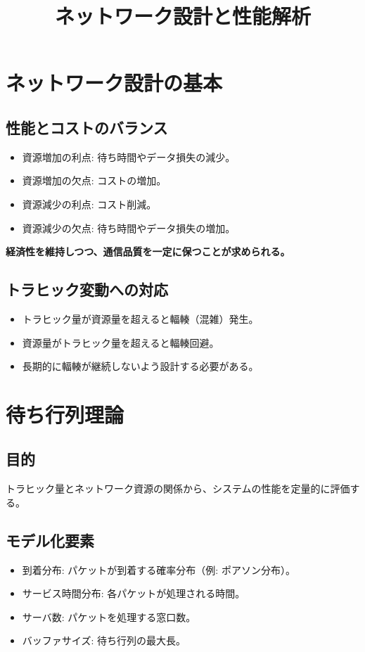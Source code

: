 \documentclass[a4paper,12pt]{ltjsarticle}
\title{ネットワーク設計と性能解析}
\author{}
\date{}
\begin{document}
\maketitle

\section{ネットワーク設計の基本}

\subsection*{性能とコストのバランス}
\begin{itemize}
    \item 資源増加の利点: 待ち時間やデータ損失の減少。
    \item 資源増加の欠点: コストの増加。
    \item 資源減少の利点: コスト削減。
    \item 資源減少の欠点: 待ち時間やデータ損失の増加。
\end{itemize}
\textbf{経済性を維持しつつ、通信品質を一定に保つことが求められる。}

\subsection*{トラヒック変動への対応}
\begin{itemize}
    \item トラヒック量が資源量を超えると輻輳（混雑）発生。
    \item 資源量がトラヒック量を超えると輻輳回避。
    \item 長期的に輻輳が継続しないよう設計する必要がある。
\end{itemize}

\section{待ち行列理論}

\subsection*{目的}
トラヒック量とネットワーク資源の関係から、システムの性能を定量的に評価する。

\subsection*{モデル化要素}
\begin{itemize}
    \item 到着分布: パケットが到着する確率分布（例: ポアソン分布）。
    \item サービス時間分布: 各パケットが処理される時間。
    \item サーバ数: パケットを処理する窓口数。
    \item バッファサイズ: 待ち行列の最大長。
\end{itemize}
\end{document}
